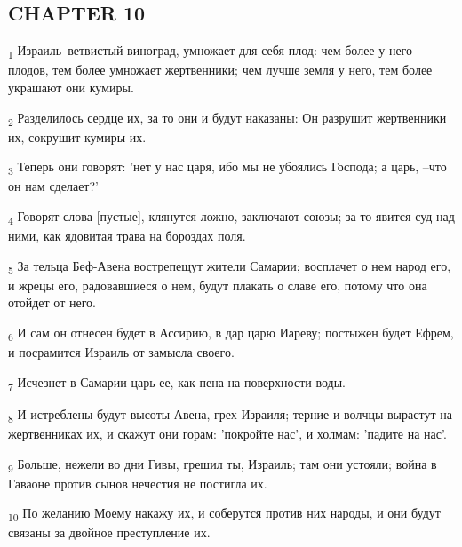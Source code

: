 \subsection{CHAPTER 10}
\begin{tcolorbox}
\textsubscript{1} Израиль--ветвистый виноград, умножает для себя плод: чем более у него плодов, тем более умножает жертвенники; чем лучше земля у него, тем более украшают они кумиры.
\end{tcolorbox}
\begin{tcolorbox}
\textsubscript{2} Разделилось сердце их, за то они и будут наказаны: Он разрушит жертвенники их, сокрушит кумиры их.
\end{tcolorbox}
\begin{tcolorbox}
\textsubscript{3} Теперь они говорят: 'нет у нас царя, ибо мы не убоялись Господа; а царь, --что он нам сделает?'
\end{tcolorbox}
\begin{tcolorbox}
\textsubscript{4} Говорят слова [пустые], клянутся ложно, заключают союзы; за то явится суд над ними, как ядовитая трава на бороздах поля.
\end{tcolorbox}
\begin{tcolorbox}
\textsubscript{5} За тельца Беф-Авена вострепещут жители Самарии; восплачет о нем народ его, и жрецы его, радовавшиеся о нем, будут плакать о славе его, потому что она отойдет от него.
\end{tcolorbox}
\begin{tcolorbox}
\textsubscript{6} И сам он отнесен будет в Ассирию, в дар царю Иареву; постыжен будет Ефрем, и посрамится Израиль от замысла своего.
\end{tcolorbox}
\begin{tcolorbox}
\textsubscript{7} Исчезнет в Самарии царь ее, как пена на поверхности воды.
\end{tcolorbox}
\begin{tcolorbox}
\textsubscript{8} И истреблены будут высоты Авена, грех Израиля; терние и волчцы вырастут на жертвенниках их, и скажут они горам: 'покройте нас', и холмам: 'падите на нас'.
\end{tcolorbox}
\begin{tcolorbox}
\textsubscript{9} Больше, нежели во дни Гивы, грешил ты, Израиль; там они устояли; война в Гаваоне против сынов нечестия не постигла их.
\end{tcolorbox}
\begin{tcolorbox}
\textsubscript{10} По желанию Моему накажу их, и соберутся против них народы, и они будут связаны за двойное преступление их.
\end{tcolorbox}
